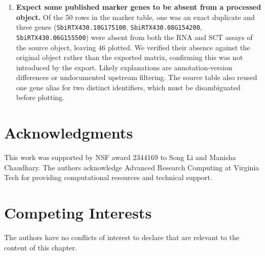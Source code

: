 \documentclass[11pt,a4paper]{article}
\begin{document}
\begin{enumerate}[leftmargin=*]
\item \textbf{Expect some published marker genes to be absent from a processed object.} Of the 50 rows in the marker table, one was an exact duplicate and three genes (\texttt{SbiRTX430.10G175100}, \texttt{SbiRTX430.08G154200}, \texttt{SbiRTX430.06G155500}) were absent from both the RNA and SCT assays of the source object, leaving 46 plotted. We verified their absence against the original object rather than the exported matrix, confirming this was not introduced by the export. Likely explanations are annotation-version differences or undocumented upstream filtering. The source table also reused one gene alias for two distinct identifiers, which must be disambiguated before plotting.

\end{enumerate}

\section*{Acknowledgments}

This work was supported by NSF award 2344169 to Song Li and Manisha Chaudhary. The authors acknowledge Advanced Research Computing at Virginia Tech for providing computational resources and technical support.

\section*{Competing Interests}

The authors have no conflicts of interest to declare that are relevant to the content of this chapter.
\end{document}
